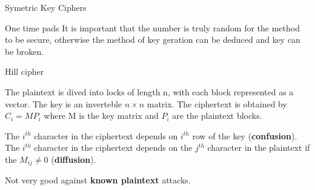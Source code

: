 \documentclass[12pt, letterpaper]{article}
\begin{document}
\begin{section}{Symetric Key Ciphers}
\begin{subsection}{One time pads}
    It is important that the number is truly random for the method to be secure,
    otherwise the method of key geration can be deduced and key can be broken.

  \end{subsection}

  \begin{subsection}{Hill cipher}

    The plaintext is dived into locks of length n, with each block represented
    as a vector. The key is an inverteble \(n \times n\) matrix. The
    ciphertext is obtained by \(C_{i} = MP_{i}\) where M is the key matrix and
    \(P_{i}\) are the plaintext blocks.

    The \(i^{th}\) character in the ciphertext depends on \(i^{th}\) row of
    the key (\textbf{confusion}). \\
    The \(i^{th}\) character in the ciphertext depends on the \(j^{th}\)
    character in the plaintext if the \(M_{ij} \neq 0\) (\textbf{diffusion}).

    Not very good against \textbf{known plaintext} attacks.

  \end{subsection}

\end{section}

\newpage
\end{document}
